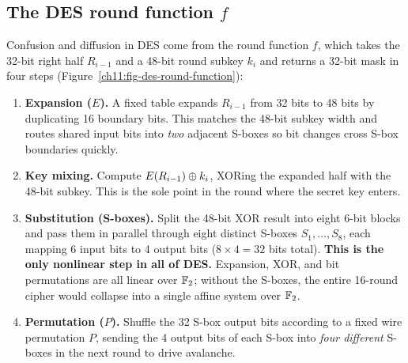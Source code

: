 \subsection{The DES round function $f$}

Confusion and diffusion in DES come from the round function $f$, which takes the 32-bit right half $R_{i-1}$ and a 48-bit round subkey $k_i$ and returns a 32-bit mask in four steps (Figure~\ref{ch11:fig-des-round-function}):

\begin{enumerate}
  \item \textbf{Expansion ($E$).} A fixed table expands $R_{i-1}$ from 32 bits to 48 bits by duplicating 16 boundary bits. This matches the 48-bit subkey width and routes shared input bits into \emph{two} adjacent S-boxes so bit changes cross S-box boundaries quickly.
  \item \textbf{Key mixing.} Compute $E(R_{i-1}) \oplus k_i$, XORing the expanded half with the 48-bit subkey. This is the sole point in the round where the secret key enters.
  \item \textbf{Substitution (S-boxes).} Split the 48-bit XOR result into eight 6-bit blocks and pass them in parallel through eight distinct S-boxes $S_1,\dots,S_8$, each mapping 6 input bits to 4 output bits ($8 \times 4 = 32$ bits total). \textbf{This is the only nonlinear step in all of DES.} Expansion, XOR, and bit permutations are all linear over $\mathbb{F}_2$; without the S-boxes, the entire 16-round cipher would collapse into a single affine system over $\mathbb{F}_2$.
  \item \textbf{Permutation ($P$).} Shuffle the 32 S-box output bits according to a fixed wire permutation $P$, sending the 4 output bits of each S-box into \emph{four different} S-boxes in the next round to drive avalanche.
\end{enumerate}


